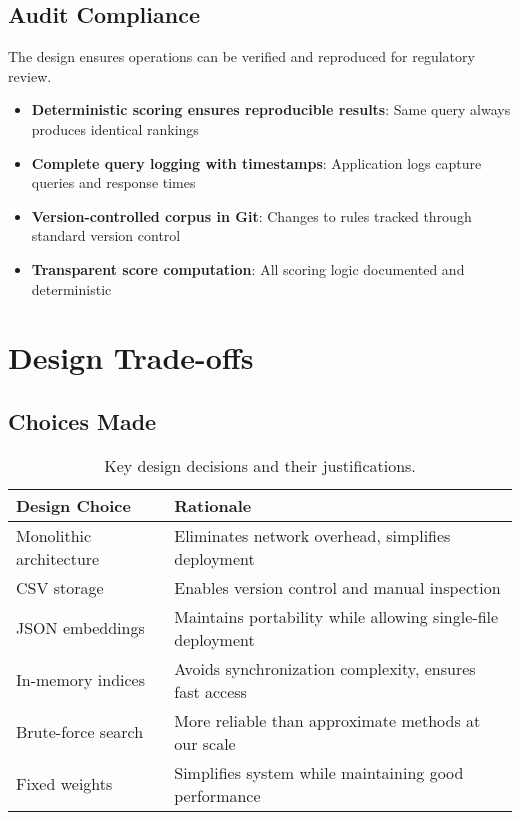 \subsection{Audit Compliance}

The design ensures operations can be verified and reproduced for regulatory review.

\begin{itemize}[leftmargin=*,itemsep=3pt,topsep=3pt]
  \item \textbf{Deterministic scoring ensures reproducible results}: Same query always produces identical rankings
  \item \textbf{Complete query logging with timestamps}: Application logs capture queries and response times
  \item \textbf{Version-controlled corpus in Git}: Changes to rules tracked through standard version control
  \item \textbf{Transparent score computation}: All scoring logic documented and deterministic
\end{itemize}

\section{Design Trade-offs}

\subsection{Choices Made}

\begin{table}[H]
\centering
\begin{tabular}{p{3.5cm}p{7.5cm}}
\toprule
\textbf{Design Choice} & \textbf{Rationale} \\
\midrule
Monolithic architecture & Eliminates network overhead, simplifies deployment \\
CSV storage & Enables version control and manual inspection \\
JSON embeddings & Maintains portability while allowing single-file deployment \\
In-memory indices & Avoids synchronization complexity, ensures fast access \\
Brute-force search & More reliable than approximate methods at our scale \\
Fixed weights & Simplifies system while maintaining good performance \\
\bottomrule
\end{tabular}
\caption{Key design decisions and their justifications.}
\label{tab:design-choices}
\end{table}

